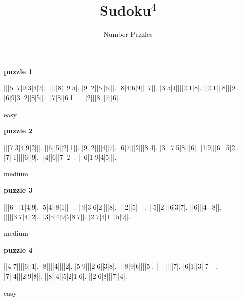 \documentclass[fontsize=24pt,letterpaper]{scrartcl}
\title{Sudoku$^4$}
\author{Number Puzzles}
\begin{document}
\maketitle
\setcounter{page}{0}
\thispagestyle{empty}
\clearpage

{\Large \bfseries \sffamily puzzle 1}
\vspace{2cm}
\begin{sudoku}
|||5||7|9|3|4|2|.
|||||8|||9|5|.
|9||2||5||6|||.
|8|4|6|9||||7||.
|3|5|9||||2|1|8|.
||2|1|||8|||9|.
|6|9|3||2||8|5||.
||7|8||6|1||||.
|2|||8|||7||6|.
\end{sudoku}
\begin{center}
    easy
\end{center}

\clearpage
\begin{flushright}
{\Large \bfseries \sffamily puzzle 2}
\end{flushright}
\vspace{2cm}
\begin{sudoku}
|||7|3|4|9|2|||.
||6||5||2||1||.
|9||2||||4||7|.
|6|7|||2|||8|4|.
|3|||7|5|8|||6|.
|1|9|||6|||5|2|.
|7||1||||6||9|.
||4||6||7||2||.
|||6|1|9|4|5|||.
\end{sudoku}
\begin{center}
   medium
\end{center}

\clearpage
{\Large \bfseries \sffamily puzzle 3}
\vspace{2cm}
\begin{sudoku}
|||6||||1|4|9|.
|5|4||8|1|||||.
||9|3|6|2||||8|.
|||2||5|||||.
||5||2|||6|3|7|.
||6|||4|||8||.
|||||3|7|4||2|.
||3|5|4|9|2|8|7||.
|2|7|4|1|||5|9||.
\end{sudoku}
\begin{center}
    medium
\end{center}

\clearpage
\begin{flushright}
{\Large \bfseries \sffamily puzzle 4}
\end{flushright}
\vspace{2cm}
\begin{sudoku}
||4|7||||6||1|.
|8||||4||||2|.
|5|9|||2|6||3|8|.
|||8|9|6||||5|.
|||||||||7|.
|6|1||3||7||||.
|7||4|||2|9|8||.
||8||4||5|2|1|6|.
||2|6|8|||7||4|.
\end{sudoku}
\begin{center}
    easy
\end{center}

\clearpage
\end{document}
